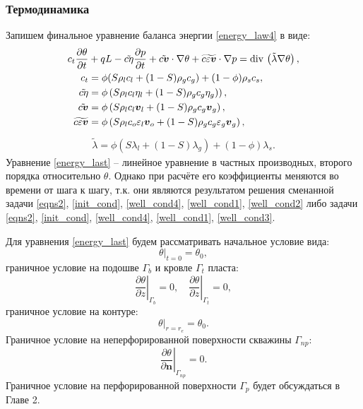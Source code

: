 \subsubsection{Термодинамика}
	Запишем финальное уравнение баланса энергии \eqref{energy_law4} в виде:
\begin{align}
	\label{energy_last}
	c_t\frac{\partial \theta}{\partial t} &+ qL - \tilde{c\eta}\frac{\partial p}{\partial t} + 
	\tilde{c\boldsymbol{v}}\cdot\nabla \theta + \widetilde{c\varepsilon\boldsymbol{v}}\cdot\nabla p = 
	{\rm div}\,\left(\tilde{\lambda} \nabla \theta\right),\\
	c_t &= \phi(S\rho_l c_l + (1-S)\rho_g c_g) + (1-\phi)\rho_{s}c_{s},\nonumber\\
	\tilde{c\eta} &= \phi\left(S\rho_l c_l \eta_l + (1-S)\rho_g c_g \eta_g)\right),\nonumber\\
	\tilde{c\boldsymbol{v}} &= \phi\left(S\rho_l c_l \boldsymbol{v}_l + (1-S)\rho_g c_g \boldsymbol{v}_g\right),\nonumber\\
	\widetilde{c\varepsilon\boldsymbol{v}} &= \phi\left(S\rho_l c_o \varepsilon_l\boldsymbol{v}_o + (1-S)\rho_g c_g \varepsilon_g\boldsymbol{v}_g\right),\nonumber
\end{align}
\begin{align}
	\label{energy_last1}
	\tilde{\lambda} = \phi(S\lambda_l + (1-S)\lambda_g) + (1-\phi)\lambda_{s}\nonumber.
\end{align}
	Уравнение \eqref{energy_last} -- линейное уравнение в частных производных, второго порядка относительно $\theta$.
	Однако при расчёте его коэффициенты меняются во времени от шага к шагу, т.к. они являются результатом решения 		сменанной задачи \eqref{eqns2}, \eqref{init_cond}, \eqref{well_cond4}, \eqref{well_cond1}, \eqref{well_cond2} либо задачи \eqref{eqns2}, 		\eqref{init_cond}, \eqref{well_cond4}, \eqref{well_cond1}, \eqref{well_cond3}.

	Для уравнения \eqref{energy_last} будем рассматривать начальное условие вида:
\begin{equation}
	\label{energy_init}
	\left. \theta \right|_{t=0} = \theta_0,
\end{equation}
	граничное условие на подошве $\Gamma_b$ и кровле $\Gamma_t$ пласта:
\begin{equation}
	\label{energy_contour3}
	\left.\frac{\partial \theta}{\partial z}\right|_{\Gamma_{b}} = 0,\quad
	\left.\frac{\partial \theta}{\partial z}\right|_{\Gamma_{t}} = 0,
\end{equation}
	граничное условие на контуре:
\begin{equation}
	\label{energy_contour}
	\left. \theta \right|_{r=r_e} = \theta_0.
\end{equation}
	Граничное условие на неперфорированной поверхности скважины $\Gamma_{np}$:
\begin{equation}
	\label{energy_contour1}
	\left. \frac{\partial\theta}{\partial \boldsymbol{n}} \right|_{\Gamma_{np}} = 0.
\end{equation}
	Граничное условие на перфорированной поверхности $\Gamma_p$ будет обсуждаться в Главе 2.